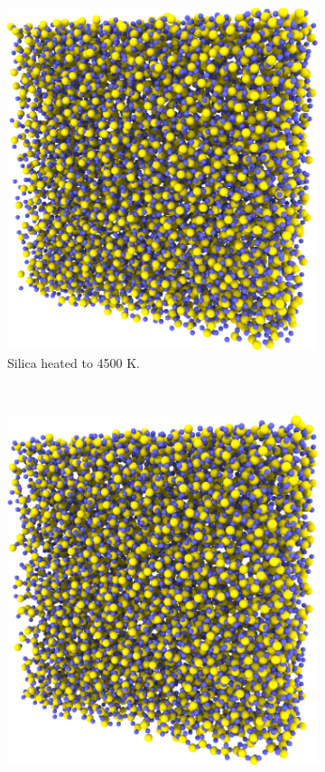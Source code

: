 \begin{figure}[htpb]
\begin{subfigure}[t]{\myfigwidth}
        \includegraphics[width=\textwidth]{images/experimental_procedure/01_10}%
        \caption{%
            Silica heated to 4500 K.%
            \label{fig:initialization_step01}%
        }%
        \hspace{8pt}
    \end{subfigure}%
    \\%
    \begin{subfigure}[t]{\myfigwidth}%
        \includegraphics[width=\textwidth]{images/experimental_procedure/02_10}%

\end{subfigure}
\end{figure}
